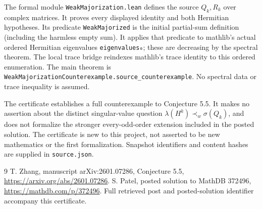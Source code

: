 \documentclass[11pt]{article}
\begin{document}
The formal module \texttt{WeakMajorization.lean} defines the source $Q_k,R_k$ over complex matrices. It proves every displayed identity and both Hermitian hypotheses. Its predicate \texttt{WeakMajorized} is the initial partial-sum definition (including the harmless empty sum). It applies that predicate to mathlib's actual ordered Hermitian eigenvalues \texttt{eigenvalues₀}; these are decreasing by the spectral theorem. The local trace bridge reindexes mathlib's trace identity to this ordered enumeration. The main theorem is \texttt{WeakMajorizationCounterexample.source\_counterexample}. No spectral data or trace inequality is assumed.

The certificate establishes a full counterexample to Conjecture 5.5. It makes no assertion about the distinct singular-value question $\lambda(H^k)\prec_w\sigma(Q_k)$, and does not formalize the stronger every-odd-order extension included in the posted solution. The certificate is new to this project, not asserted to be new mathematics or the first formalization. Snapshot identifiers and content hashes are supplied in \texttt{source.json}.
\begin{thebibliography}{9}
 T. Zhang, manuscript arXiv:2601.07286, Conjecture 5.5, \url{https://arxiv.org/abs/2601.07286}.
 S. Patel, posted solution to MathDB 372496, \url{https://mathdb.com/p/372496}. Full retrieved post and posted-solution identifier accompany this certificate.
\end{thebibliography}
\end{document}
